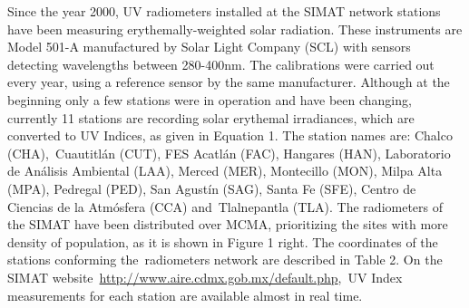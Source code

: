\documentclass{article}
\begin{document}
{Since the year 2000, UV radiometers installed at the SIMAT network
stations have been measuring erythemally-weighted solar radiation. These
instruments are Model 501-A manufactured by Solar Light Company (SCL)
with sensors detecting wavelengths between 280-400nm. The calibrations
were carried out every year, using a reference sensor by the same
manufacturer. Although at the beginning only a few stations were in
operation and have been changing, currently 11 stations are recording
solar erythemal irradiances, which are converted to UV Indices, as given
in Equation 1. The station names are: Chalco (CHA),~Cuautitlán (CUT),
FES Acatlán (FAC), Hangares (HAN), Laboratorio de Análisis Ambiental
(LAA), Merced (MER), Montecillo (MON), Milpa Alta (MPA), Pedregal (PED),
San Agustín (SAG), Santa Fe (SFE), Centro de Ciencias de la Atmósfera
(CCA) and~Tlalnepantla (TLA). The radiometers of the SIMAT have been
distributed over MCMA, prioritizing the sites with more density of
population, as it is shown in Figure 1 %
right. The coordinates of the stations conforming the~radiometers
network are described in Table 2. On the SIMAT
website~\url{http://www.aire.cdmx.gob.mx/default.php},~UV Index
measurements for each station are available almost in real time.~

}
\end{document}
